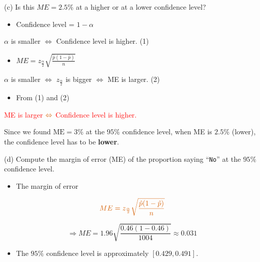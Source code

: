 \documentclass[
  11pt,
  ignorenonframetext,
]{beamer}
\providecommand{\tightlist}{%
  \setlength{\itemsep}{0pt}\setlength{\parskip}{0pt}}
\begin{document}
\begin{frame}{(c) Is this \(ME=2.5\%\) at a higher or at a lower
confidence level?}
\protect\hypertarget{c-is-this-me2.5-at-a-higher-or-at-a-lower-confidence-level}{}
\begin{itemize}
\tightlist
\item
  Confidence level = \(1-\alpha\)
\end{itemize}

\quad\quad\quad \(\alpha\) is smaller \(\Leftrightarrow\) Confidence
level is higher. \quad\quad  (1)

\begin{itemize}
\tightlist
\item
  \(ME = z_{\frac{\alpha}{2}} \sqrt{\frac{\hat{p}(1-\hat{p})}{n}}\)
\end{itemize}

\quad\quad\quad \(\alpha\) is smaller \(\Leftrightarrow\)
\(z_{\frac{\alpha}{2}}\) is bigger \(\Leftrightarrow\) ME is larger.
\quad  (2)

\pause

\begin{itemize}
\tightlist
\item
  From (1) and (2)
\end{itemize}

\quad\quad\quad \textcolor{red}{ME is larger}
\(\color{red}{\Leftrightarrow}\)
\textcolor{red}{Confidence level is higher.}

\pause

Since we found \(\text{ME} = 3\%\) at the \(95\%\) confidence level,
when ME is \(2.5\%\) (lower), the confidence level has to be
\textbf{lower}.
\end{frame}

\begin{frame}{(d) Compute the margin of error (ME) of the proportion
saying ``\texttt{No}'' at the \(95\%\) confidence level.}
\protect\hypertarget{d-compute-the-margin-of-error-me-of-the-proportion-saying-no-at-the-95-confidence-level.}{}
\pause

\begin{itemize}
\tightlist
\item
  The margin of error
\end{itemize}

\[
\color{red}{ME = z_{\frac{\alpha}{2}} \sqrt{\frac{\hat{p}(1-\hat{p})}{n}}}
\]

\[
\Rightarrow ME = 1.96 \sqrt{\frac{0.46(1-0.46)}{1004}} \approx 0.031
\]

\begin{itemize}
\tightlist
\item
  The \(95\%\) confidence level is approximately \([0.429,0.491]\).
\end{itemize}
\end{frame}
\end{document}
